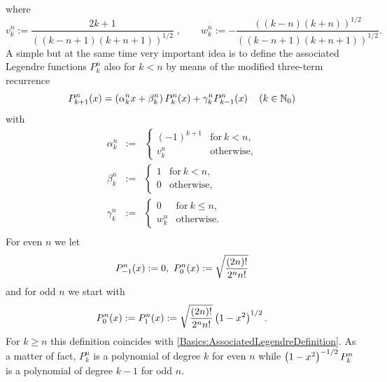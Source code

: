 where
\begin{equation} 
  \label{Basics:AssociatedLegendreRecurrenceCoefficients}
v_{k}^n := \frac{2k+1}{((k-n+1)(k+n+1))^{1/2}}\; ,\qquad w_{k}^n := - \frac{((k-n)(k+n))^{1/2}}{((k-n+1)(k+n+1))^{1/2}}.
\end{equation}
A simple but at the same time very important idea is to define the associated Legendre functions $P_k^n$ also for 
$k < n$ by means of the modified three-term recurrence
\begin{equation} 
  \label{Basics:AssociatedLegendreDefinitionExtended}
  P_{k+1}^n{\hspace{-0.4ex}}\left(x\right) = \left(\alpha_{k}^n x + \beta_{k}^n\right) P_{k}^n{\hspace{-0.4ex}}\left(x\right) + \gamma_{k}^n P_{k-1}^n{\hspace{-0.4ex}}\left(x\right)\quad\left(k \in \mathbb{N}_{0}\right)
\end{equation}
with
\begin{eqnarray*}
  \alpha_{k}^n & := & \left\{
    \begin{array}{ll}
      (-1)^{k+1} & \text{for}\ k < n,\\
      v_{k}^n    & \text{otherwise},
    \end{array}\right.\\
  \beta_{k}^n & := & \left\{
    \begin{array}{lll}
      1 & \text{for}\ k < n,\\
      0 & \text{otherwise},
    \end{array}\right.\\
  \gamma_{k}^n & := & \left\{
    \begin{array}{lll}
      0       & \text{for}\ k \leq n,\\
      w_{k}^n & \text{otherwise.}
    \end{array}\right.\\
\end{eqnarray*}
For even $n$ we let
$$ \fun{P_{-1}^n}{x} := 0,\ \fun{P_{0}^n}{x} := \sqrt{\frac{(2n)!}{2^n n!}}$$
and for odd $n$ we start with
$$ P_{0}^n{\hspace{-0.4ex}}\left(x\right) := P_{1}^n{\hspace{-0.4ex}}\left(x\right) := \sqrt{\frac{(2n)!}{2^n n!}} \left(1-x^2\right)^{1/2}.$$
For $k \ge n$ this definition coincides with \eqref{Basics:AssociatedLegendreDefinition}. 
As a matter of fact, $P_{k}^n$ is a polynomial of degree $k$ for even $n$ while 
$\left(1-x^2\right)^{-1/2}P_{k}^n$ is a polynomial of degree $k-1$ for odd $n$.


